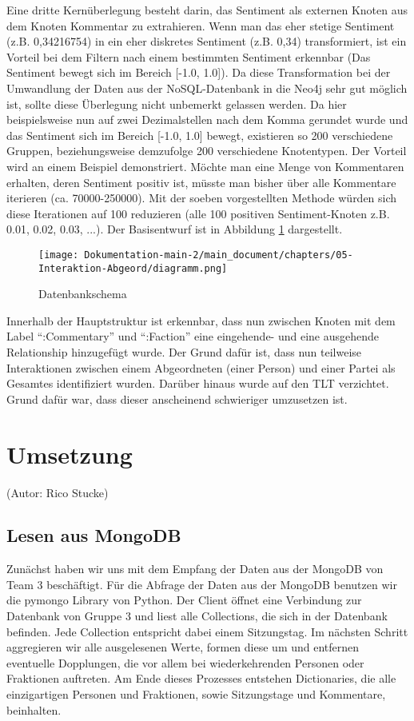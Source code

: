 \newline
Eine dritte Kernüberlegung besteht darin, das Sentiment als externen Knoten aus dem Knoten Kommentar zu extrahieren. Wenn man das eher stetige Sentiment (z.B. 0,34216754) in ein eher diskretes Sentiment (z.B. 0,34) transformiert, ist ein Vorteil bei dem Filtern nach einem bestimmten Sentiment erkennbar (Das Sentiment bewegt sich im Bereich [-1.0, 1.0]). Da diese Transformation bei der Umwandlung der Daten aus der NoSQL-Datenbank in die Neo4j sehr gut möglich ist, sollte diese Überlegung nicht unbemerkt gelassen werden. Da hier beispielsweise nun auf zwei Dezimalstellen nach dem Komma gerundet wurde und das Sentiment sich im Bereich [-1.0, 1.0] bewegt, existieren so 200 verschiedene Gruppen, beziehungsweise demzufolge 200 verschiedene Knotentypen. Der Vorteil wird an einem Beispiel demonstriert. Möchte man eine Menge von Kommentaren erhalten, deren Sentiment positiv ist, müsste man bisher über alle Kommentare iterieren (ca. 70000-250000). Mit der soeben vorgestellten Methode würden sich diese Iterationen auf 100 reduzieren (alle 100 positiven Sentiment-Knoten z.B. 0.01, 0.02, 0.03, ...). Der Basisentwurf ist in Abbildung \ref{fig:Dokumentation-main-2/main_document/chapters/05-Interaktion-Abgeord/image9.png} dargestellt.
\begin{figure}[htb]
    \centering
    \texttt{[image: Dokumentation-main-2/main\_document/chapters/05-Interaktion-Abgeord/diagramm.png]} 
    \caption{Datenbankschema}
    \label{fig:Dokumentation-main-2/main_document/chapters/05-Interaktion-Abgeord/image9.png}
\end{figure}
Innerhalb der Hauptstruktur ist erkennbar, dass nun zwischen Knoten mit dem Label \enquote{:Commentary} und \enquote{:Faction} eine eingehende- und eine ausgehende Relationship hinzugefügt wurde. Der Grund dafür ist, dass nun teilweise Interaktionen zwischen einem Abgeordneten (einer Person) und einer Partei als Gesamtes identifiziert wurden. Darüber hinaus wurde auf den TLT verzichtet. Grund dafür war, dass dieser anscheinend schwieriger umzusetzen ist.
\section{Umsetzung}\label{sec:04_03_umsetzung}
(Autor: Rico Stucke)
\subsection{Lesen aus MongoDB}
Zunächst haben wir uns mit dem Empfang der Daten aus der MongoDB von Team 3 beschäftigt. Für die Abfrage der Daten aus der MongoDB benutzen wir die pymongo Library von Python. Der Client öffnet eine Verbindung zur Datenbank von Gruppe 3 und liest alle Collections, die sich in der Datenbank befinden. Jede Collection entspricht dabei einem Sitzungstag. Im nächsten Schritt aggregieren wir alle ausgelesenen Werte, formen diese um und entfernen eventuelle Dopplungen, die vor allem bei wiederkehrenden Personen oder Fraktionen auftreten. Am Ende dieses Prozesses entstehen Dictionaries, die alle einzigartigen Personen und Fraktionen, sowie Sitzungstage und Kommentare, beinhalten.
